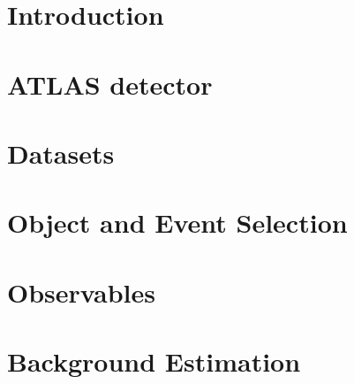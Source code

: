 \documentclass[PAPER, atlasdraft=true, texlive=2016, UKenglish,coverpage]{\ATLASLATEXPATH atlasdoc}
\begin{document}
\maketitle

\tableofcontents


\section{Introduction}
\label{sec:intro}


\section{ATLAS detector}
\label{sec:detector}



\section{Datasets}
\label{sec:data}


\section{Object and Event Selection}
\label{sec:obj}


\section{Observables}
\label{sec:obs}


\section{Background Estimation}
\label{sec:analysis}

\end{document}
